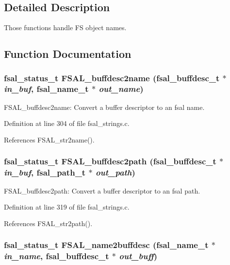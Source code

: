\subsection{Detailed Description}
Those functions handle FS object names. 

\subsection{Function Documentation}
\subsubsection[{FSAL\_\-buffdesc2name}]{\setlength{\rightskip}{0pt plus 5cm}fsal\_\-status\_\-t FSAL\_\-buffdesc2name (fsal\_\-buffdesc\_\-t $\ast$ {\em in\_\-buf}, \/  fsal\_\-name\_\-t $\ast$ {\em out\_\-name})}\label{group__FSALNameFunctions_g46f91146c872ff335d8547f33203f3f7}


FSAL\_\-buffdesc2name: Convert a buffer descriptor to an fsal name. 

Definition at line 304 of file fsal\_\-strings.c.

References FSAL\_\-str2name().
\subsubsection[{FSAL\_\-buffdesc2path}]{\setlength{\rightskip}{0pt plus 5cm}fsal\_\-status\_\-t FSAL\_\-buffdesc2path (fsal\_\-buffdesc\_\-t $\ast$ {\em in\_\-buf}, \/  fsal\_\-path\_\-t $\ast$ {\em out\_\-path})}\label{group__FSALNameFunctions_g213919f3487ec817411a288a6e8dd66d}


FSAL\_\-buffdesc2path: Convert a buffer descriptor to an fsal path. 

Definition at line 319 of file fsal\_\-strings.c.

References FSAL\_\-str2path().
\subsubsection[{FSAL\_\-name2buffdesc}]{\setlength{\rightskip}{0pt plus 5cm}fsal\_\-status\_\-t FSAL\_\-name2buffdesc (fsal\_\-name\_\-t $\ast$ {\em in\_\-name}, \/  fsal\_\-buffdesc\_\-t $\ast$ {\em out\_\-buff})}\label{group__FSALNameFunctions_g5aee66141ed415b3f251a14698050df8}



